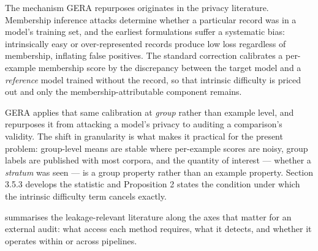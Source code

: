 The mechanism GERA repurposes originates in the privacy literature. Membership inference attacks  determine whether a particular record was in a model's training set, and the earliest formulations suffer a systematic bias: intrinsically easy or over-represented records produce low loss regardless of membership, inflating false positives. The standard correction  calibrates a per-example membership score by the discrepancy between the target model and a \emph{reference} model trained without the record, so that intrinsic difficulty is priced out and only the membership-attributable component remains.

GERA applies that same calibration at \emph{group} rather than example level, and repurposes it from attacking a model's privacy to auditing a comparison's validity. The shift in granularity is what makes it practical for the present problem: group-level means are stable where per-example scores are noisy, group labels are published with most corpora, and the quantity of interest --- whether a \emph{stratum} was seen --- is a group property rather than an example property. Section 3.5.3 develops the statistic and Proposition 2 states the condition under which the intrinsic difficulty term cancels exactly.

 summarises the leakage-relevant literature along the axes that matter for an external audit: what access each method requires, what it detects, and whether it operates within or across pipelines.

